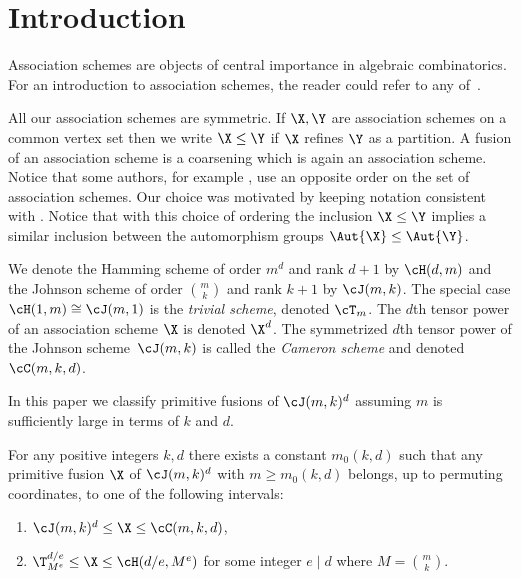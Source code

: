 


\section{Introduction}

Association schemes are objects of central importance in algebraic combinatorics.
For an introduction to association schemes, the reader could refer to any of~\cite{CP,BI,Z,B,E}.

All our association schemes are symmetric.
If $\X, \Y$ are association schemes on a common vertex set then we write $\X \le \Y$ if $\X$ refines $\Y$ as a partition.
A fusion of an association scheme is a coarsening which is again an association scheme.
{Notice that some authors, for example \cite{KK}, use an opposite order on the set of association schemes. Our choice was motivated by keeping notation consistent with \cite{B,E}. Notice that with this choice of ordering the inclusion $\X \le \Y$ implies a similar inclusion between the automorphism groups $\Aut{\X}\le \Aut{\Y}$.}

We denote the Hamming scheme of order $m^d$ and rank $d+1$ by $\cH(d, m)$
and the Johnson scheme of order $\binom{m}{k}$ and rank $k+1$ by $\cJ(m, k)$.
The special case $\cH(1, m) \cong \cJ(m, 1)$ is the \emph{trivial scheme}, denoted $\cT_m$.
The $d$th tensor power of an association scheme $\X$ is denoted $\X^d$.
The symmetrized $d$th tensor power of the Johnson scheme~$\cJ(m, k)$ is called the \emph{Cameron scheme} and denoted $\cC(m, k, d)$.

In this paper we classify primitive fusions of $\cJ(m, k)^d$ assuming $m$ is sufficiently large in terms of $k$ and $d$.


\begin{theorem}
    \label{main-thm}
    {For any positive integers $k,d$ there exists a constant $m_0(k,d)$ such that
    any primitive fusion $\X$ of $\cJ(m, k)^d$ with $m \geq m_0(k, d)$ belongs, up to permuting coordinates, to one of the following intervals:
    \begin{enumerate}
        \item $\cJ(m, k)^d \leq \X \leq \cC(m, k, d)$,  
        \item $\T_{M^e}^{d/e} \leq \X \leq \cH(d/e, M^e)$ for some integer $e \mid d$ where $M=\binom{m}{k}$.
    \end{enumerate}
    }
\end{theorem}

